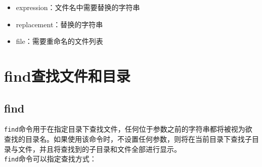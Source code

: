 \documentclass[12pt, openany, oneside]{book}
\begin{document}
\begin{itemize}
    \item expression：文件名中需要替换的字符串

    \item replacement：替换的字符串

    \item file：需要重命名的文件列表
\end{itemize}

\newpage

\section{find查找文件和目录}

\subsection{find}

\lstinline|find|命令用于在指定目录下查找文件，任何位于参数之前的字符串都将被视为欲查找的目录名。如果使用该命令时，不设置任何参数，则将在当前目录下查找子目录与文件，并且将查找到的子目录和文件全部进行显示。 \\

\lstinline|find|命令可以指定查找方式：
\end{document}

